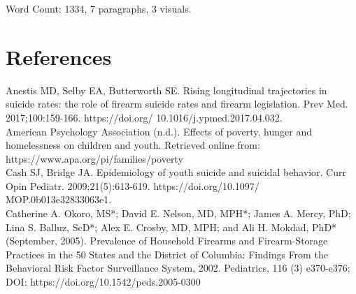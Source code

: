 \documentclass{article}
\begin{document}
Word Count: 1334, 7 paragraphs, 3 visuals.

\section*{References}

Anestis MD, Selby EA, Butterworth SE. Rising longitudinal trajectories in suicide rates: the role of firearm suicide rates and firearm legislation. Prev Med. 2017;100:159-166. https://doi.org/ 10.1016/j.ypmed.2017.04.032.\\

American Psychology Association (n.d.). Effects of poverty, hunger and homelessness on 
children and youth. Retrieved online from: https://www.apa.org/pi/families/poverty\\

Cash SJ, Bridge JA. Epidemiology of youth suicide and suicidal behavior. Curr Opin Pediatr. 2009;21(5):613-619. https://doi.org/10.1097/ MOP.0b013e32833063e1.\\

Catherine A. Okoro, MS*; David E. Nelson, MD, MPH*; James A. Mercy, PhD; Lina S. 
Balluz, ScD*; Alex E. Crosby, MD, MPH; and Ali H. Mokdad, PhD* (September, 2005). Prevalence of Household Firearms and Firearm-Storage Practices in the 50 States and the District of Columbia: Findings From the Behavioral Risk Factor Surveillance System, 2002. Pediatrics, 116 (3) e370-e376; DOI: https://doi.org/10.1542/peds.2005-0300
\end{document}
